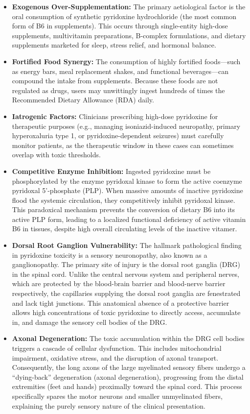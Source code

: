 \begin{itemize}
    \item \textbf{Exogenous Over-Supplementation:} The primary aetiological factor is the oral consumption of synthetic pyridoxine hydrochloride (the most common form of B6 in supplements). This occurs through single-entity high-dose supplements, multivitamin preparations, B-complex formulations, and dietary supplements marketed for sleep, stress relief, and hormonal balance.
    \item \textbf{Fortified Food Synergy:} The consumption of highly fortified foods---such as energy bars, meal replacement shakes, and functional beverages---can compound the intake from supplements. Because these foods are not regulated as drugs, users may unwittingly ingest hundreds of times the Recommended Dietary Allowance (RDA) daily.
    \item \textbf{Iatrogenic Factors:} Clinicians prescribing high-dose pyridoxine for therapeutic purposes (e.g., managing isoniazid-induced neuropathy, primary hyperoxaluria type 1, or pyridoxine-dependent seizures) must carefully monitor patients, as the therapeutic window in these cases can sometimes overlap with toxic thresholds.
    \item \textbf{Competitive Enzyme Inhibition:} Ingested pyridoxine must be phosphorylated by the enzyme pyridoxal kinase to form the active coenzyme pyridoxal 5'-phosphate (PLP). When massive amounts of inactive pyridoxine flood the systemic circulation, they competitively inhibit pyridoxal kinase. This paradoxical mechanism prevents the conversion of dietary B6 into its active PLP form, leading to a localized functional deficiency of active vitamin B6 in tissues, despite high overall circulating levels of the inactive vitamer.
    \item \textbf{Dorsal Root Ganglion Vulnerability:} The hallmark pathological finding in pyridoxine toxicity is a sensory neuronopathy, also known as a ganglionopathy. The primary site of injury is the dorsal root ganglia (DRG) in the spinal cord. Unlike the central nervous system and peripheral nerves, which are protected by the blood-brain barrier and blood-nerve barrier respectively, the capillaries supplying the dorsal root ganglia are fenestrated and lack tight junctions. This anatomical absence of a protective barrier allows high concentrations of toxic pyridoxine to directly access, accumulate in, and damage the sensory cell bodies of the DRG.
    \item \textbf{Axonal Degeneration:} The toxic accumulation within the DRG cell bodies triggers a cascade of cellular dysfunction. This includes mitochondrial impairment, oxidative stress, and the disruption of axonal transport. Consequently, the long axons of the large myelinated sensory fibers undergo a ``dying-back'' degeneration (axonal degeneration), progressing from the distal extremities (feet and hands) proximally toward the spinal cord. This process specifically spares the motor neurons and smaller unmyelinated fibers, explaining the purely sensory nature of the clinical presentation.
\end{itemize}

